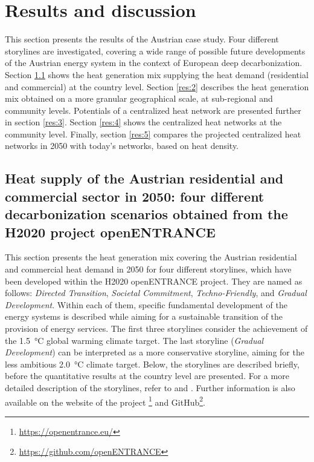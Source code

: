 \section{Results and discussion}\label{results}
This section presents the results of the Austrian case study. Four different storylines are investigated, covering a wide range of possible future developments of the Austrian energy system in the context of European deep decarbonization. Section \ref{res:1} shows the heat generation mix supplying the heat demand (residential and commercial) at the country level. Section \ref{res:2} describes the heat generation mix obtained on a more granular geographical scale, at sub-regional and community levels. Potentials of a centralized heat network are presented further in section \ref{res:3}. Section \ref{res:4} shows the centralized heat networks at the community level. Finally, section \ref{res:5} compares the projected centralized heat networks in 2050 with today's networks, based on heat density.

\subsection{Heat supply of the Austrian residential and commercial sector in 2050: four different decarbonization scenarios obtained from the H2020 project openENTRANCE}\label{res:1}
This section presents the heat generation mix covering the Austrian residential and commercial heat demand in 2050 for four different storylines, which have been developed within the H2020 openENTRANCE project. They are named as follows: \textit{Directed Transition}, \textit{Societal Commitment}, \textit{Techno-Friendly}, and \textit{Gradual Development}. Within each of them, specific fundamental development of the energy systems is described while aiming for a sustainable transition of the provision of energy services. The first three storylines consider the achievement of the \SI{1.5}{\degreeCelsius} global warming climate target. The last storyline (\textit{Gradual Development}) can be interpreted as a more conservative storyline, aiming for the less ambitious \SI{2.0}{\degreeCelsius} climate target. Below, the storylines are described briefly, before the quantitative results at the country level are presented. For a more detailed description of the storylines, refer to \cite{auer2020quantitative} and \cite{auer2020development}. Further information is also available on the website of the project \footnote{\url{https://openentrance.eu/}} and GitHub\footnote{\url{https://github.com/openENTRANCE}}.\vspace{0.3cm}

